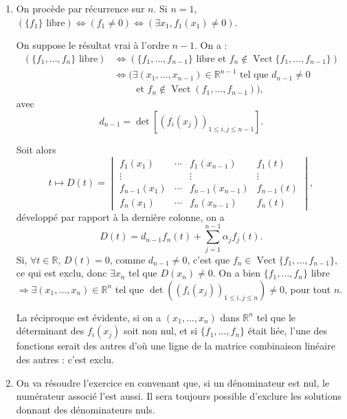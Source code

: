 \begin{enumerate}[label=\arabic*.,leftmargin=2.2em,itemsep=1.2em]
Comme
\[
\det(L_1,L_2,\ldots,L_n)=\det(L_1,L_1+L_2,L_2+L_3,\ldots,L_{n-1}+L_n),
\]
(fonction $n$-linéaire alternée des lignes), et que la nouvelle matrice est triangulaire supérieure, de diagonale $-1,2(-1)^2,2(-1)^3,\ldots,2(-1)^n$ on a
\[
\det A_n=2^{n-1}(-1)^{\frac{n(n+1)}2}.
\]

\item On procède par récurrence sur $n$. Si $n=1$, $(\{f_1\}\text{ libre})\Longleftrightarrow(f_1\ne0)\Longleftrightarrow(\exists x_1,f_1(x_1)\ne0)$.

On suppose le résultat vrai à l'ordre $n-1$. On a :
\[
\begin{aligned}
(\{f_1,\ldots,f_n\}\text{ libre})
&\Longleftrightarrow(\{f_1,\ldots,f_{n-1}\}\text{ libre et }f_n\notin\operatorname{Vect}\{f_1,\ldots,f_{n-1}\})\\
&\Longleftrightarrow\bigl(\exists(x_1,\ldots,x_{n-1})\in\mathbb R^{n-1}\text{ tel que }d_{n-1}\ne0\\
&\qquad\text{ et }f_n\notin\operatorname{Vect}(f_1,\ldots,f_{n-1})\bigr),
\end{aligned}
\]
avec
\[
d_{n-1}=\det[(f_i(x_j))_{1\le i,j\le n-1}].
\]

Soit alors
\[
t\longmapsto D(t)=
\begin{vmatrix}
f_1(x_1)&\cdots&f_1(x_{n-1})&f_1(t)\\
\vdots&&\vdots&\vdots\\
f_{n-1}(x_1)&\cdots&f_{n-1}(x_{n-1})&f_{n-1}(t)\\
f_n(x_1)&\cdots&f_n(x_{n-1})&f_n(t)
\end{vmatrix},
\]
développé par rapport à la dernière colonne, on a
\[
D(t)=d_{n-1}f_n(t)+\sum_{j=1}^{n-1}\alpha_jf_j(t).
\]
Si, $\forall t\in\mathbb R$, $D(t)=0$, comme $d_{n-1}\ne0$, c'est que $f_n\in\operatorname{Vect}\{f_1,\ldots,f_{n-1}\}$, ce qui est exclu, donc $\exists x_n$ tel que $D(x_n)\ne0$. On a bien $\{f_1,\ldots,f_n\}$ libre $\Rightarrow\exists(x_1,\ldots,x_n)\in\mathbb R^n$ tel que $\det((f_i(x_j))_{1\le i,j\le n})\ne0$, pour tout $n$.

La réciproque est évidente, si on a $(x_1,\ldots,x_n)$ dans $\mathbb R^n$ tel que le déterminant des $f_i(x_j)$ soit non nul, et si $\{f_1,\ldots,f_n\}$ était liée, l'une des fonctions serait  des autres d'où une ligne de la matrice combinaison linéaire des autres : c'est exclu.

\item On va résoudre l'exercice en convenant que, si un dénominateur est nul, le numérateur associé l'est aussi. Il sera toujours possible d'exclure les solutions donnant des dénominateurs nuls.


\end{enumerate}
